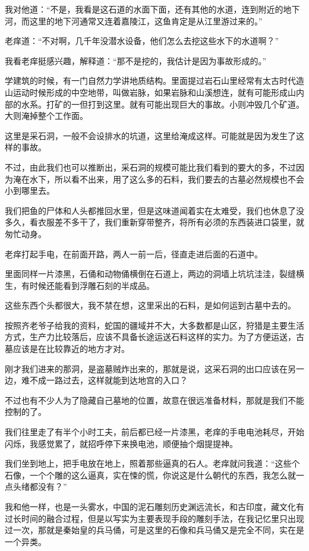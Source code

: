 我对他道：“不是，我看是这石道的水面下面，还有其他的水道，连到附近的地下河，而这里的地下河通常又连着嘉陵江，这鱼肯定是从江里游过来的。”

老痒道：“不对啊，几千年没潜水设备，他们怎么去挖这些水下的水道啊？”

我看老痒挺感兴趣，解释道：“那不是挖的，我估计是因为事故形成的。”

学建筑的时候，有一门自然力学讲地质结构。里面提过岩石山里经常有太古时代造山运动时候形成的中空地带，叫做岩脉，如果岩脉和山溪想连，就有可能形成山内部的水系。打矿的一但打到这里。就有可能出现巨大的事故。小则冲毁几个矿道。大则淹掉整个工作面。

这里是采石洞，一般不会设排水的坑道，这里给淹成这样。可能就是因为发生了这样的事故。

不过，由此我们也可以推断出，采石洞的规模可能比我们看到的要大的多，不过因为淹在水下，所以看不出来，用了这么多的石料，我们要去的古墓必然规模也不会小到哪里去。

我们把鱼的尸体和人头都推回水里，但是这味道闻着实在太难受，我们也休息了没多久，看衣服差不多干了，我们重新穿带整齐，将所有必须的东西装进口袋里，就匆忙动身。

老痒打起手电，在前面开路，两人一前一后，径直走进后面的石道中。

里面同样一片漆黑，石俑和动物俑横倒在石道上，两边的洞墙上坑坑洼洼，裂缝横生，有时候还能看到浮雕石刻的半成品。

这些东西个头都很大，我不禁在想，这里采出的石料，是如何运到古墓中去的。

按照齐老爷子给我的资料，蛇国的疆域并不大，大多数都是山区，狩猎是主要生活方式，生产力比较落后，应该不具备长途运送石料这样的实力。为了方便运送，古墓应该是在比较靠近的地方才对。

刚才我们进来的那洞，是盗墓贼炸出来的，那就是说，这采石洞的出口应该在另一边，难不成一路过去，这样就能到达地宫的入口？

不过也有不少人为了隐藏自己墓地的位置，故意在很远准备材料，那就是我们不能控制的了。

我们往里走了有半个小时工夫，前后都已经一片漆黑，老痒的手电电池耗尽，开始闪烁，我感觉累了，就招呼停下来换电池，顺便抽个烟提提神。

我们坐到地上，把手电放在地上，照着那些逼真的石人。老痒就问我道：“这些个石像，一个个雕的这么逼真，实在悚的慌，你说这是什么朝代的东西，我怎么就一点头绪都没有？”

我和他一样，也是一头雾水，中国的泥石雕刻历史渊远流长，和古印度，藏文化有过长时间的融合过程，但是以写实为主要表现手段的雕刻手法，在我记忆里只出现过一次，那就是秦始皇的兵马俑，可是这里的石像和兵马俑又是完全不同，实在是一个异类。

